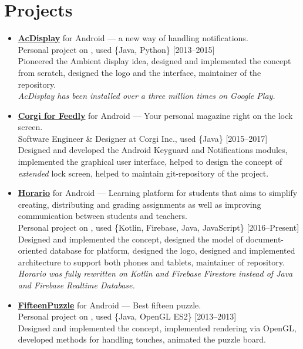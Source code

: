 \documentclass[a4paper]{article}
\begin{document}
	\section*{Projects}
	\begin{itemize}
		\item \href{http://artemchep.com/acdisplay/}{\textbf{AcDisplay}} for Android --- a new way of handling notifications. \\[0.2em]
		{\footnotesize Personal project on \faGithub, used \{Java, Python\} \hfill [2013--2015]} \\[0.2em]
		Pioneered the Ambient display idea, designed and implemented the concept from scratch, designed the logo and the interface, maintainer of the repository.\\[0.2em]
		\textit{AcDisplay has been installed over a three million times on Google Play.}

		\item \href{http://getcorgi.com/}{\textbf{Corgi for Feedly}} for Android --- Your personal magazine right on the lock screen. \\[0.2em]
		{\footnotesize Software Engineer \& Designer at Corgi Inc., used \{Java\} \hfill [2015--2017]} \\[0.2em]
		Designed and developed the Android Keyguard and Notifications modules, implemented the graphical user interface, helped to design the concept of \textit{extended} lock screen, helped to maintain git-repository of the project.

		\item \href{http://artemchep.com/horario/}{\textbf{Horario}} for Android --- Learning platform for students that aims to simplify creating, distributing and grading assignments as well as improving communication between students and teachers. \\[0.2em]
		{\footnotesize Personal project on \faGithub, used \{Kotlin, Firebase, Java, JavaScript\} \hfill [2016--Present]} \\[0.2em]
		Designed and implemented the concept, designed the model of document-oriented database for platform, designed the logo, designed and implemented architecture to support both phones and tablets, maintainer of repository. \\[0.2em]
		\textit{Horario was fully rewritten on Kotlin and Firebase Firestore instead of Java and Firebase Realtime Database.} 
		
		\item \href{https://play.google.com/store/apps/details?id=com.achep.fifteenpuzzle}{\textbf{FifteenPuzzle}} for Android --- Best fifteen puzzle. \\[0.2em]
		{\footnotesize Personal project on \faGithub, used \{Java, OpenGL ES2\} \hfill [2013--2013]} \\[0.2em]
		Designed and implemented the concept, implemented rendering via OpenGL, developed methods for handling touches, animated the puzzle board.
		

\end{itemize}
\end{document}

